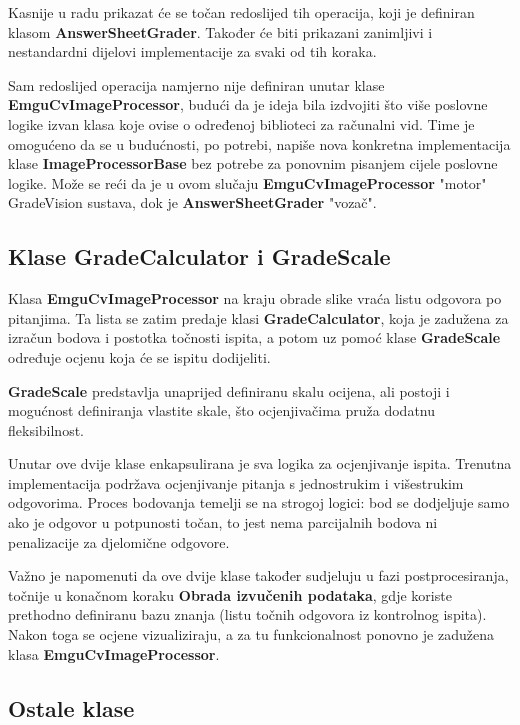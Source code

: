 \documentclass{foi}
\begin{document}
Kasnije u radu prikazat će se točan redoslijed tih operacija, koji je definiran klasom \textbf{AnswerSheetGrader}. Također će biti prikazani zanimljivi i nestandardni dijelovi implementacije za svaki od tih koraka.

Sam redoslijed operacija namjerno nije definiran unutar klase \textbf{EmguCvImageProcessor}, budući da je ideja bila izdvojiti što više poslovne logike izvan klasa koje ovise o određenoj biblioteci za računalni vid. Time je omogućeno da se u budućnosti, po potrebi, napiše nova konkretna implementacija klase \textbf{ImageProcessorBase} bez potrebe za ponovnim pisanjem cijele poslovne logike. Može se reći da je u ovom slučaju \textbf{EmguCvImageProcessor} "motor" GradeVision sustava, dok je \textbf{AnswerSheetGrader} "vozač".

\subsection{Klase GradeCalculator i GradeScale}

Klasa \textbf{EmguCvImageProcessor} na kraju obrade slike vraća listu odgovora po pitanjima. Ta lista se zatim predaje klasi \textbf{GradeCalculator}, koja je zadužena za izračun bodova i postotka točnosti ispita, a potom uz pomoć klase \textbf{GradeScale} određuje ocjenu koja će se ispitu dodijeliti.

\textbf{GradeScale} predstavlja unaprijed definiranu skalu ocijena, ali postoji i mogućnost definiranja vlastite skale, što ocjenjivačima pruža dodatnu fleksibilnost.

Unutar ove dvije klase enkapsulirana je sva logika za ocjenjivanje ispita. Trenutna implementacija podržava ocjenjivanje pitanja s jednostrukim i višestrukim odgovorima. Proces bodovanja temelji se na strogoj logici: bod se dodjeljuje samo ako je odgovor u potpunosti točan, to jest nema parcijalnih bodova ni penalizacije za djelomične odgovore.

Važno je napomenuti da ove dvije klase također sudjeluju u fazi postprocesiranja, točnije u konačnom koraku \textbf{Obrada izvučenih podataka}, gdje koriste prethodno definiranu bazu znanja (listu točnih odgovora iz kontrolnog ispita). Nakon toga se ocjene vizualiziraju, a za tu funkcionalnost ponovno je zadužena klasa \textbf{EmguCvImageProcessor}.

\subsection{Ostale klase}
\end{document}
